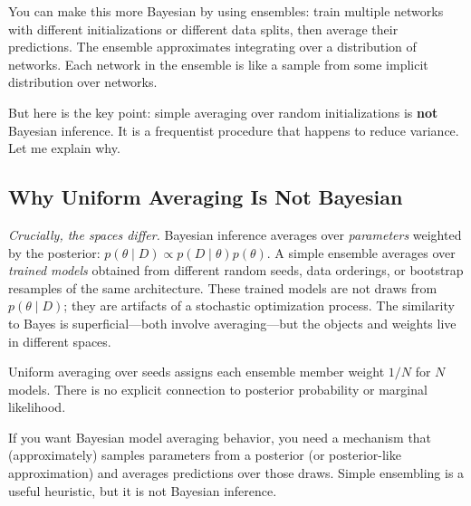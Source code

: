 You can make this more Bayesian by using ensembles: train multiple networks with different initializations or different data splits, then average their predictions. The ensemble approximates integrating over a distribution of networks. Each network in the ensemble is like a sample from some implicit distribution over networks.

But here is the key point: simple averaging over random initializations is \textbf{not} Bayesian inference. It is a frequentist procedure that happens to reduce variance. Let me explain why.

\subsection{Why Uniform Averaging Is Not Bayesian}

\textit{Crucially, the spaces differ.} Bayesian inference averages over \emph{parameters} weighted by the posterior: $p(\theta\mid D)\propto p(D\mid\theta)p(\theta)$. A simple ensemble averages over \emph{trained models} obtained from different random seeds, data orderings, or bootstrap resamples of the same architecture. These trained models are not draws from $p(\theta\mid D)$; they are artifacts of a stochastic optimization process. The similarity to Bayes is superficial---both involve averaging---but the objects and weights live in different spaces.

Uniform averaging over seeds assigns each ensemble member weight $1/N$ for $N$ models. There is no explicit connection to posterior probability or marginal likelihood.

If you want Bayesian model averaging behavior, you need a mechanism that (approximately) samples parameters from a posterior (or posterior-like approximation) and averages predictions over those draws. Simple ensembling is a useful heuristic, but it is not Bayesian inference.



